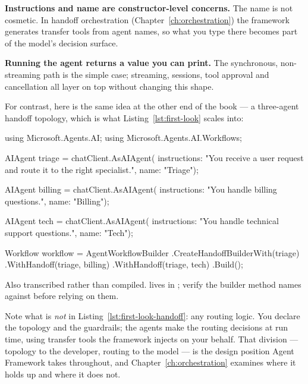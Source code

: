 \textbf{Instructions and name are constructor-level concerns.} The name is not
cosmetic. In handoff orchestration (Chapter~\ref{ch:orchestration}) the framework
generates transfer tools from agent names, so what you type there becomes part of
the model's decision surface.

\textbf{Running the agent returns a value you can print.} The synchronous,
non-streaming path is the simple case; streaming, sessions, tool approval and
cancellation all layer on top without changing this shape.

For contrast, here is the same idea at the other end of the book --- a three-agent
handoff topology, which is what Listing~\ref{lst:first-look} scales into:

\begin{csharp}[caption={Where this is going: a handoff topology (Chapter~\ref{ch:orchestration})}, label={lst:first-look-handoff}]
using Microsoft.Agents.AI;
using Microsoft.Agents.AI.Workflows;

AIAgent triage = chatClient.AsAIAgent(
    instructions: "You receive a user request and route it to the right specialist.",
    name: "Triage");

AIAgent billing = chatClient.AsAIAgent(
    instructions: "You handle billing questions.", name: "Billing");

AIAgent tech = chatClient.AsAIAgent(
    instructions: "You handle technical support questions.", name: "Tech");

Workflow workflow = AgentWorkflowBuilder
    .CreateHandoffBuilderWith(triage)
    .WithHandoff(triage, billing)
    .WithHandoff(triage, tech)
    .Build();
\end{csharp}

\begin{verifybox}
Also transcribed rather than compiled.  lives in
; verify the builder method names against
\mafworkflows{} before relying on them.
\end{verifybox}

Note what is \emph{not} in Listing~\ref{lst:first-look-handoff}: any routing
logic. You declare the topology and the guardrails; the agents make the routing
decisions at run time, using transfer tools the framework injects on your behalf.
That division --- topology to the developer, routing to the model --- is the
design position Agent Framework takes throughout, and Chapter~\ref{ch:orchestration}
examines where it holds up and where it does not.

